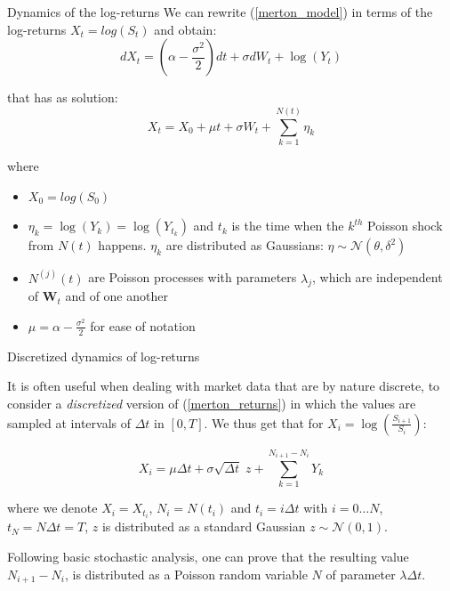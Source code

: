 \documentclass{beamer}
\begin{document}
\begin{frame}{Dynamics of the log-returns}
We can rewrite (\ref{merton_model}) in terms of the log-returns $X_t = log(S_t)$ and obtain:
\begin{equation}
    dX_t = (\alpha - \frac{\sigma^2}{2})dt + \sigma dW_t + \log (Y_t)
\end{equation}

that has as solution:
\begin{equation}
\label{merton_returns}
    X_t =X_0 +  \mu t + \sigma W_t + \sum_{k=1}^{N(t)} \eta_k
\end{equation}

where 
\begin{itemize}
    \item $X_0=log(S_0)$
    \item $\eta_k= \log(Y_k) = \log(Y_{t_k})$ and $t_k$ is the time when the $k^{th}$ Poisson shock from $N(t)$ happens.
    $\eta_k$ are distributed as Gaussians: $\eta \sim \mathcal{N}(\theta , \delta^2)$
    \item $N^{(j)}(t)$ are Poisson processes with parameters $\lambda_j$, which are independent of $\mathbf{W}_t$ and of one another
    \item $\mu = \alpha - \frac{\sigma^2}{2} $ for ease of notation
\end{itemize}

\end{frame}

\begin{frame}{Discretized dynamics of log-returns}

It is often useful when dealing with market data that are by nature discrete, to consider a \textit{discretized} version of (\ref{merton_returns}) in which the values are sampled at intervals of $\Delta t$ in $[0, T]$. We thus get that for $X_i = \log(\frac{S_{i+1}}{S_i})$:

\begin{equation}
\label{discrete_returns}
    X_i =  \mu \Delta t + \sigma \sqrt{\Delta t} \; z +  \sum_{k=1}^{N_{i+1} - N_i} Y_k
\end{equation}

where we denote $X_i = X_{t_i}$, $N_i = N(t_i)$ and $t_i = i \Delta t$ with $i= 0 \dots N$, $t_N = N \Delta t= T$,  $z$ is distributed as a standard Gaussian $ z\sim \mathcal{N}(0,1)$.

 Following basic stochastic analysis, one can prove that the resulting value $N_{i+1} - N_i$,  is distributed as a Poisson random variable $N$ of parameter $\lambda \Delta t$.
\end{frame}
\end{document}
